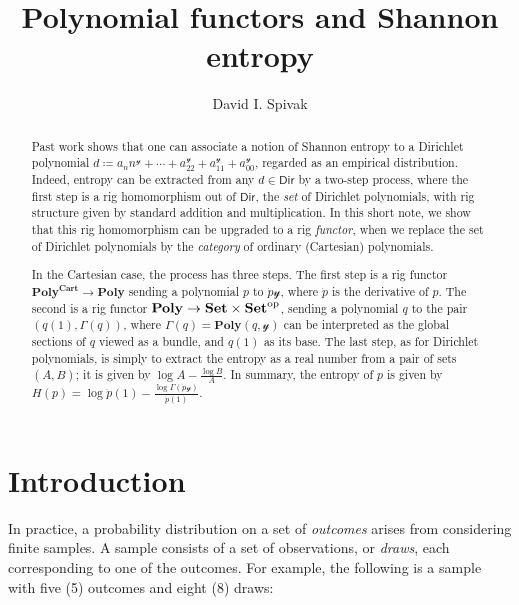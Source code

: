 \documentclass[11pt, one side, article]{memoir}
\theoremstyle{definition}
\theoremstyle{plain}
\newcommand{\Set}[1]{\mathsf{#1}}%
\newcommand{\Cat}[1]{\mathbf{#1}}%
\newcommand{\op}{^\tn{op}}
\newcommand{\tn}[1]{\textnormal{#1}}
\newcommand{\smset}{\Cat{Set}}
\newcommand{\yon}{\mathcal{y}}
\newcommand{\poly}{\Cat{Poly}}
\newcommand{\dir}{\Set{Dir}}
\newcommand{\polycart}{\poly^{\Cat{Cart}}}
\newcommand{\0}{\textsf{0}}
\newcommand{\1}{\tn{\textsf{1}}}
\begin{document}
\title{Polynomial functors and Shannon entropy}

\author{David I. Spivak}

\date{\vspace{-.2in}}

\maketitle

\begin{abstract}
Past work shows that one can associate a notion of Shannon entropy to a Dirichlet polynomial $d\coloneqq a_nn^\yon+\cdots+a_22^\yon+a_11^\yon+a_00^\yon$, regarded as an empirical distribution. Indeed, entropy can be extracted from any $d\in\dir$ by a two-step process, where the first step is a rig homomorphism out of $\dir$, the \emph{set} of Dirichlet polynomials, with rig structure given by standard addition and multiplication. In this short note, we show that this rig homomorphism can be upgraded to a rig \emph{functor}, when we replace the set of Dirichlet polynomials by the \emph{category} of ordinary (Cartesian) polynomials.

In the Cartesian case, the process has three steps. The first step is a rig functor $\polycart\to\poly$ sending a polynomial $p$ to $\dot{p}\yon$, where $\dot{p}$ is the derivative of $p$. The second is a rig functor $\poly\to\smset\times\smset\op$, sending a polynomial $q$ to the pair $(q(1),\Gamma(q))$, where $\Gamma(q)=\poly(q,\yon)$ can be interpreted as the global sections of $q$ viewed as a bundle, and $q(1)$ as its base. The last step, as for Dirichlet polynomials, is simply to extract the entropy as a real number from a pair of sets $(A,B)$; it is given by $\log A-\frac{\log B}{A}$. In summary, the entropy of $p$ is given by $H(p)=\log \dot{p}(1)-\frac{\log\Gamma(\dot{p}\yon)}{\dot{p}(1)}$.
\end{abstract}

\chapter{Introduction}

In practice, a probability distribution on a set of \emph{outcomes} arises from considering finite samples. A sample consists of a set of observations, or \emph{draws}, each corresponding to one of the outcomes. For example, the following is a sample with five (5) outcomes and eight (8) draws:
\end{document}
